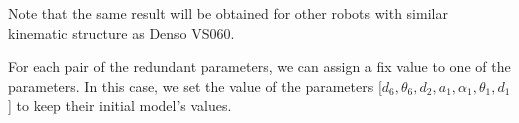 Note that the same result will be obtained for other robots with similar kinematic structure as Denso VS060. 

For each pair of the redundant parameters, we can assign a fix value to one of the parameters. In this case, we set the value of the parameters [$d_6, \theta_6, d_2, a_1, \alpha_1, \theta_1, d_1$] to keep their initial model's values. 
